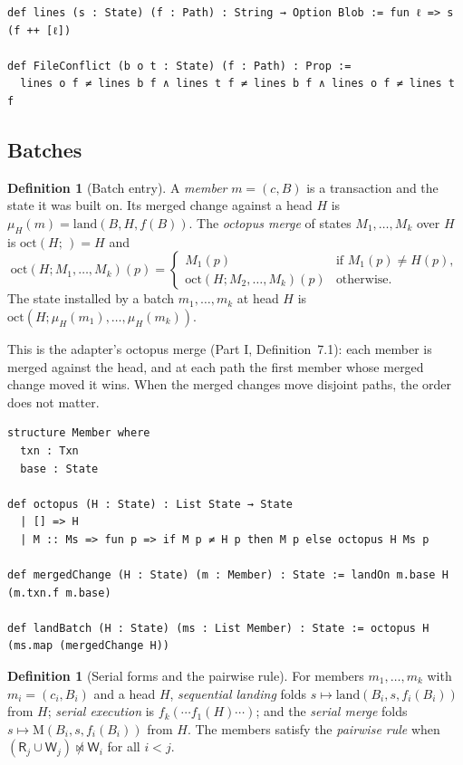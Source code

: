 \documentclass[11pt,letterpaper]{article}
\theoremstyle{definition}
\newtheorem{definition}[theorem]{Definition}
\theoremstyle{remark}
\newcommand{\R}{\mathsf{R}}
\newcommand{\W}{\mathsf{W}}
\newcommand{\nmeets}{\not\bowtie}
\newcommand{\op}[1]{\mathrm{#1}}
\newcommand{\lnd}{\op{land}}
\newcommand{\mrg}{\op{M}}
\newcommand{\oct}{\op{oct}}
\begin{document}
\begin{lstlisting}[language=Lean,caption={Lines as child locations (\texttt{YonedaTx/Merge.lean})},label={lst:mcbl:lines}]
def lines (s : State) (f : Path) : String → Option Blob := fun ℓ => s (f ++ [ℓ])

def FileConflict (b o t : State) (f : Path) : Prop :=
  lines o f ≠ lines b f ∧ lines t f ≠ lines b f ∧ lines o f ≠ lines t f
\end{lstlisting}

\subsection{Batches}

\begin{definition}[Batch entry]
\label{def:mcbl:batch}
A \emph{member} $m=(c,B)$ is a transaction and the state it was built on. Its merged change against a head $H$ is $\mu_H(m)=\lnd(B,H,f(B))$. The \emph{octopus merge} of states $M_1,\dots,M_k$ over $H$ is $\oct(H;\,)=H$ and
\[
\oct(H;M_1,\dots,M_k)(p)=\begin{cases}M_1(p) & \text{if } M_1(p)\neq H(p),\\ \oct(H;M_2,\dots,M_k)(p) & \text{otherwise.}\end{cases}
\]
The state installed by a batch $m_1,\dots,m_k$ at head $H$ is $\oct(H;\mu_H(m_1),\dots,\mu_H(m_k))$.
\end{definition}

This is the adapter's octopus merge (Part I, Definition~7.1): each member is merged against the head, and at each path the first member whose merged change moved it wins. When the merged changes move disjoint paths, the order does not matter.

\begin{lstlisting}[language=Lean,caption={Batch members and the batch entry (\texttt{YonedaTx/Batch.lean})},label={lst:mcbl:batchdefs}]
structure Member where
  txn : Txn
  base : State

def octopus (H : State) : List State → State
  | [] => H
  | M :: Ms => fun p => if M p ≠ H p then M p else octopus H Ms p

def mergedChange (H : State) (m : Member) : State := landOn m.base H (m.txn.f m.base)

def landBatch (H : State) (ms : List Member) : State := octopus H (ms.map (mergedChange H))
\end{lstlisting}

\begin{definition}[Serial forms and the pairwise rule]
\label{def:mcbl:serial}
For members $m_1,\dots,m_k$ with $m_i=(c_i,B_i)$ and a head $H$, \emph{sequential landing} folds $s\mapsto\lnd(B_i,s,f_i(B_i))$ from $H$; \emph{serial execution} is $f_k(\cdots f_1(H)\cdots)$; and the \emph{serial merge} folds $s\mapsto\mrg(B_i,s,f_i(B_i))$ from $H$. The members satisfy the \emph{pairwise rule} when $(\R_j\cup\W_j)\nmeets\W_i$ for all $i<j$.
\end{definition}
\end{document}
